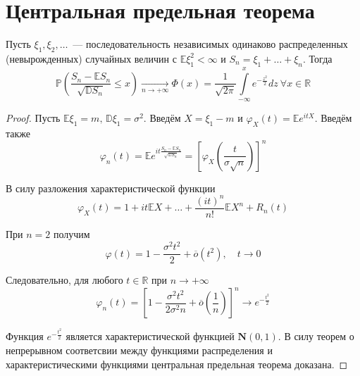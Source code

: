 \section{Центральная предельная теорема}
\begin{namedthm}
    Пусть $\xi_{1}, \xi_{2}, \ldots$~--- последовательность независимых одинаково распределенных (невырожденных) случайных величин с $\mathbb{E} \xi_{1}^{2}<\infty$ и $S_{n}=\xi_{1}+\ldots+\xi_{n}$. Тогда
    \begin{equation*}
        \mathbb{P}\left(\frac{S_{n}-\mathbb{E} S_{n}}{\sqrt{\mathbb{D} S_{n}}} \leqslant x\right)
        \xrightarrow[n \to +\infty]{}
        \Phi(x) = \frac{1}{\sqrt{2 \pi}} \int\limits_{-\infty}^{x} e^{-\frac{z^{2}}{2}} dz~ \forall x \in \mathbb{R}
    \end{equation*}
\end{namedthm}
\begin{proof}
Пусть $\mathbb{E} \xi_{1}=m,\, \mathbb{D} \xi_{1}=\sigma^{2}$. Введём $X = \xi_1 - m$ и $\varphi_X(t)=\mathbb{E} e^{i tX}$. Введём также
\begin{equation*}
    \varphi_{n}(t)=\mathbb{E} e^{i t \frac{S_{n}-\mathbb{E} S_{n}}{\sqrt{\mathbb{D} S_{n}}}} = 
    \left[\varphi_X\left(\frac{t}{\sigma \sqrt{n}}\right)\right]^{n}
\end{equation*}

В силу разложения характеристической функции
\begin{equation*}
    \varphi_{X}(t)=1+i t \mathbb{E} X+\ldots+\frac{(i t)^{n}}{n !} \mathbb{E} X^{n}+R_{n}(t)
\end{equation*}

При $n=2$ получим 
\begin{equation*}
    \varphi(t)=1-\frac{\sigma^{2} t^{2}}{2}+\overline{o}\left(t^{2}\right), \quad t \rightarrow 0
\end{equation*}

Следовательно, для любого $t \in \mathbb{R}$ при $n \to +\infty$
\begin{equation*}
    \varphi_{n}(t)=\left[1-\frac{\sigma^{2} t^{2}}{2 \sigma^{2} n}+\overline{o}\left(\frac{1}{n}\right)\right]^n \rightarrow e^{-\frac{t^{2}}{2}}
\end{equation*}

Функция $e^{-\frac{t^{2}}{2}}$ является характеристической функцией $\mathbf{N}(0,1)$. В силу теорем о непрерывном соответсвии между функциями распределения и характеристическими функциями центральная предельная теорема доказана.
\end{proof}

